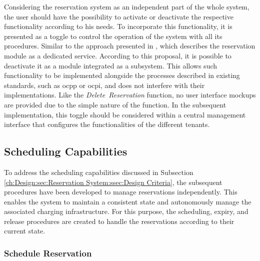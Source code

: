Considering the reservation system as an independent part of the whole system, the user should have the possibility to activate or deactivate the respective functionality according to his needs.
To incorporate this functionality, it is presented as a toggle to control the operation of the system with all its procedures. Similar to the approach presented in \cite{orcioni_ev_2020}, which describes the reservation module as a dedicated service. According to this proposal, it is possible to deactivate it as a module integrated as a subsystem.
This allows such functionality to be implemented alongside the processes described in existing standards, such as \acrshort{ocpp} or \acrshort{ocpi}, and does not interfere with their implementations.
Like the \textit{Delete~Reservation} function, no user interface mockups are provided due to the simple nature of the function. In the subsequent implementation, this toggle should be considered within a central management interface that configures the functionalities of the different tenants.

\newpage

\subsection{Scheduling Capabilities}
\label{ch:Design:sec:Reservation System:ssec:Scheduling Capabilities}

To address the scheduling capabilities discussed in Subsection \ref{ch:Design:sec:Reservation System:ssec:Design Criteria}, the subsequent procedures have been developed to manage reservations independently.
This enables the system to maintain a consistent state and autonomously manage the associated charging infrastructure.
For this purpose, the scheduling, expiry, and release procedures are created to handle the reservations according to their current state.

\subsubsection{Schedule Reservation}
\label{ch:Design:sec:Reservation System:ssec:Scheduling Capabilities:sssec:Schedule Reservation}

